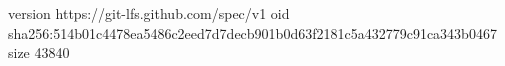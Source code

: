 version https://git-lfs.github.com/spec/v1
oid sha256:514b01c4478ea5486c2eed7d7decb901b0d63f2181c5a432779c91ca343b0467
size 43840
